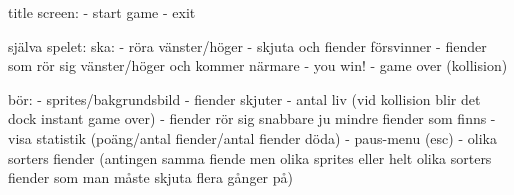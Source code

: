title screen:
- start game
- exit

själva spelet:
ska:
- röra vänster/höger
- skjuta och fiender försvinner
- fiender som rör sig vänster/höger och kommer närmare
- you win!
- game over (kollision)

bör: 
- sprites/bakgrundsbild
- fiender skjuter
    - antal liv (vid kollision blir det dock instant game over)
- fiender rör sig snabbare ju mindre fiender som finns
- visa statistik (poäng/antal fiender/antal fiender döda)
- paus-menu (esc)
- olika sorters fiender (antingen samma fiende men olika sprites eller helt olika sorters fiender som man måste skjuta flera gånger på)

